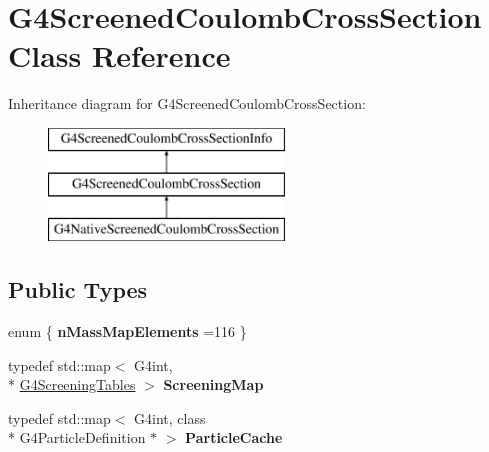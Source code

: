 \hypertarget{classG4ScreenedCoulombCrossSection}{\section{G4\-Screened\-Coulomb\-Cross\-Section Class Reference}
\label{classG4ScreenedCoulombCrossSection}
}
Inheritance diagram for G4\-Screened\-Coulomb\-Cross\-Section\-:\begin{figure}[H]
\begin{center}
\leavevmode
\includegraphics[height=3.000000cm]{classG4ScreenedCoulombCrossSection}
\end{center}
\end{figure}
\subsection*{Public Types}
\begin{DoxyCompactItemize}
\item 
enum \{ {\bfseries n\-Mass\-Map\-Elements} =116
 \}
\item 
\hypertarget{classG4ScreenedCoulombCrossSection_a936cd19a7a45353257f74f1e061de448}{typedef std\-::map$<$ G4int, \\*
\hyperlink{structG4ScreeningTables}{G4\-Screening\-Tables} $>$ {\bfseries Screening\-Map}}\label{classG4ScreenedCoulombCrossSection_a936cd19a7a45353257f74f1e061de448}

\item 
\hypertarget{classG4ScreenedCoulombCrossSection_a89d84b815b40ba7fe83462843964d3e4}{typedef std\-::map$<$ G4int, class \\*
G4\-Particle\-Definition $\ast$ $>$ {\bfseries Particle\-Cache}}\label{classG4ScreenedCoulombCrossSection_a89d84b815b40ba7fe83462843964d3e4}

\end{DoxyCompactItemize}
